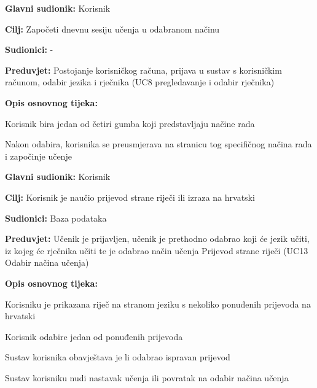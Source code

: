 \noindent {}
\begin{packed_item}

	\item \textbf{Glavni sudionik: } Korisnik
	\item \textbf{Cilj: } Započeti dnevnu sesiju učenja u odabranom načinu
	\item \textbf{Sudionici: } -
	\item \textbf{Preduvjet: } Postojanje korisničkog računa, prijava u sustav s korisničkim računom, odabir jezika i rječnika (UC8 pregledavanje i odabir rječnika)
	\item  \textbf{Opis osnovnog tijeka:}
	
	\item[] \begin{packed_enum}
		
		\item Korisnik bira jedan od četiri gumba koji predstavljaju načine rada
		\item Nakon odabira, korisnika se preusmjerava na stranicu tog specifičnog
		načina rada i započinje učenje

	\end{packed_enum}
	
\end{packed_item}




\noindent {}
\begin{packed_item}

	\item \textbf{Glavni sudionik: } Korisnik
	\item \textbf{Cilj: } Korisnik je naučio prijevod strane riječi ili izraza na hrvatski
	\item \textbf{Sudionici: } Baza podataka
	\item \textbf{Preduvjet: } Učenik je prijavljen, učenik je prethodno odabrao koji će jezik učiti, iz kojeg će rječnika učiti te je odabrao način učenja Prijevod strane riječi (UC13 Odabir načina učenja)
	\item  \textbf{Opis osnovnog tijeka:}
	
	\item[] \begin{packed_enum}
		
		\item Korisniku je prikazana riječ na stranom jeziku s nekoliko ponuđenih prijevoda na hrvatski
		\item Korisnik odabire jedan od ponuđenih prijevoda
		\item Sustav korisnika obavještava je li odabrao ispravan prijevod
		\item Sustav korisniku nudi nastavak učenja ili povratak na odabir načina učenja

	\end{packed_enum}

\end{packed_item}



